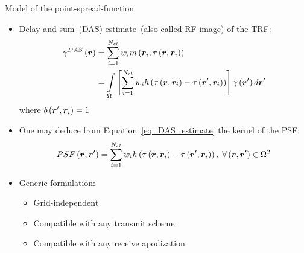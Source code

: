 {\begin{block}{Model of the point-spread-function}
	\begin{itemize}
		\item Delay-and-sum~(DAS) estimate~(also called RF image) of the TRF:
		\begin{align}
		\label{eq_DAS_estimate}
			\gamma^{DAS} \left(\bm{r}\right) &= \sum \limits_{i=1}^{N_{el}} w_i m \left(\bm{r}_i, \tau \left(\bm{r}, \bm{r}_i\right)\right) \nonumber \\
			&= \int \limits_{\Omega} \left[\sum \limits_{i=1}^{N_{el}} w_i h \left(\tau \left(\bm{r}, \bm{r}_i\right) - \tau \left(\bm{r}', \bm{r}_i\right) \right)\right] \gamma\left(\bm{r}'\right) d \bm{r}'
		\end{align}
		where $b \left(\bm{r}', \bm{r}_i\right) = 1$
		\item One may deduce from Equation~\eqref{eq_DAS_estimate} 
		the kernel of the PSF:
		\begin{equation}
			\label{eq_PSF_estimate}
			PSF \left(\bm{r}, \bm{r}'\right) = \sum \limits_{i=1}^{N_{el}} w_i h \left(\tau \left(\bm{r}, \bm{r}_i\right) - \tau \left(\bm{r}', \bm{r}_i\right) \right), \; \forall \left(\bm{r}, \bm{r}'\right) \in \Omega^2
		\end{equation}
		\item Generic formulation:
		\begin{itemize}
			\item Grid-independent
			\item Compatible with any transmit scheme
			\item Compatible with any receive apodization 
		\end{itemize}
	\end{itemize}
\end{block}
\vfill


}
